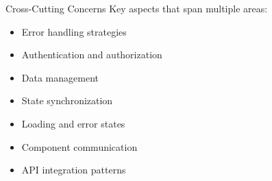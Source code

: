 \begin{concept}{Cross-Cutting Concerns}
    Key aspects that span multiple areas:
    \begin{itemize}
        \item Error handling strategies
        \item Authentication and authorization
        \item Data management
        \item State synchronization
        \item Loading and error states
        \item Component communication
        \item API integration patterns
    \end{itemize}
\end{concept}

